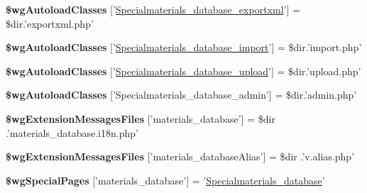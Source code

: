 \begin{DoxyCompactItemize}
\item 
\hypertarget{materials__database_8php_ad2d24b082b6f93dd652fcf1e95d628e3}{{\bfseries \$wg\+Autoload\+Classes} \mbox{[}'\hyperlink{classSpecialmaterials__database__exportxml}{Specialmaterials\+\_\+database\+\_\+exportxml}'\mbox{]} = \$dir.'exportxml.\+php'}\label{materials__database_8php_ad2d24b082b6f93dd652fcf1e95d628e3}

\item 
\hypertarget{materials__database_8php_a43f163549e3c7adf1d28f51e0f4cc12a}{{\bfseries \$wg\+Autoload\+Classes} \mbox{[}'\hyperlink{classSpecialmaterials__database__import}{Specialmaterials\+\_\+database\+\_\+import}'\mbox{]} = \$dir.'import.\+php'}\label{materials__database_8php_a43f163549e3c7adf1d28f51e0f4cc12a}

\item 
\hypertarget{materials__database_8php_a7a854632192d7740799481a449f2b916}{{\bfseries \$wg\+Autoload\+Classes} \mbox{[}'\hyperlink{classSpecialmaterials__database__upload}{Specialmaterials\+\_\+database\+\_\+upload}'\mbox{]} = \$dir.'upload.\+php'}\label{materials__database_8php_a7a854632192d7740799481a449f2b916}

\item 
\hypertarget{materials__database_8php_a3434fd84597b751e9590f0adee62dd5e}{{\bfseries \$wg\+Autoload\+Classes} \mbox{[}'Specialmaterials\+\_\+database\+\_\+admin'\mbox{]} = \$dir.'admin.\+php'}\label{materials__database_8php_a3434fd84597b751e9590f0adee62dd5e}

\item 
\hypertarget{materials__database_8php_a11556df5064e1350e77ec507c501dbdf}{{\bfseries \$wg\+Extension\+Messages\+Files} \mbox{[}'materials\+\_\+database'\mbox{]} = \$dir .'materials\+\_\+database.\+i18n.\+php'}\label{materials__database_8php_a11556df5064e1350e77ec507c501dbdf}

\item 
\hypertarget{materials__database_8php_ad23da8729b8e5b8f963600c435cfc285}{{\bfseries \$wg\+Extension\+Messages\+Files} \mbox{[}'materials\+\_\+database\+Alias'\mbox{]} = \$dir .'v.\+alias.\+php'}\label{materials__database_8php_ad23da8729b8e5b8f963600c435cfc285}

\item 
\hypertarget{materials__database_8php_afed8f7a7ccf986ba48dd34eba13f1c73}{{\bfseries \$wg\+Special\+Pages} \mbox{[}'materials\+\_\+database'\mbox{]} = '\hyperlink{classSpecialmaterials__database}{Specialmaterials\+\_\+database}'}\label{materials__database_8php_afed8f7a7ccf986ba48dd34eba13f1c73}


\end{DoxyCompactItemize}
